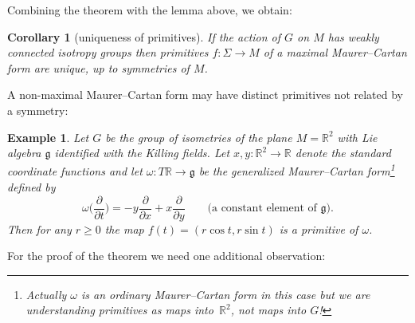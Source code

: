 \documentclass[pdftex]{sigma}%
\numberwithin{equation}{section}
\newtheorem{Corollary}[Theorem]{Corollary}
\newtheorem{Example}[Theorem]{Example}
\renewcommand{\ge}{\geqslant}
\begin{document}
Combining the theorem with the lemma above, we obtain:
\begin{Corollary}[uniqueness of primitives]\label{uniquenessC}
 If the action of $G$ on $M$ has weakly connected isotropy groups
 then primitives $f \colon \Sigma \rightarrow M$ of a maximal
 Maurer--Cartan form are unique, up to symmetries of $M$.
\end{Corollary}

A non-maximal Maurer--Cartan form may have distinct primitives not
related by a symmetry:
\begin{Example} Let $G$ be the group of isometries of the plane
$M={\mathbb R}^2 $ with Lie algebra ${\mathfrak g} $ identified with
the Killing fields. Let $x, y \colon {\mathbb R}^2 \rightarrow
{\mathbb R} $ denote the standard coordinate functions and let $
\omega \colon T {\mathbb R} \rightarrow {\mathfrak g} $ be the
generalized Maurer--Cartan form\footnote{Actually $\omega $ is an
ordinary Maurer--Cartan form in this case but we are understanding
primitives as maps into~${\mathbb R}^2$, not maps into $G$!} defined
by
\begin{equation*}
\omega \bigg( \frac{\partial }{\partial t}\bigg)=
-y\frac{\partial }{\partial x }+x \frac{\partial }{\partial y}
\qquad\text{(a constant element of $\mathfrak g$).}
 \end{equation*}
 Then for any $r\ge 0$ the map $f (t)=(r\cos t, r\sin
t)$ is a primitive of $\omega $.
\end{Example}

For the proof of the theorem we need one additional observation:
\end{document}
